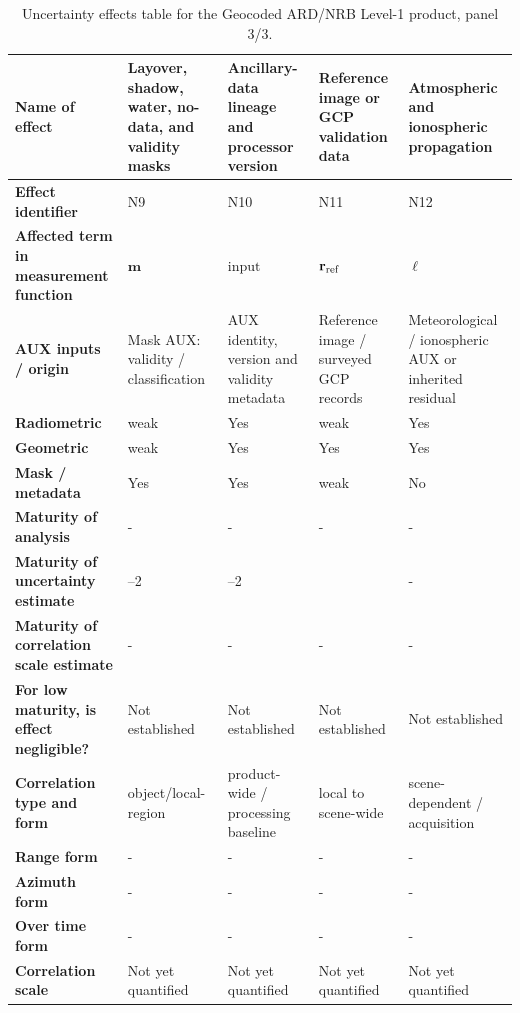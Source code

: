 \begin{table}[p]
\centering\scriptsize
\renewcommand{\arraystretch}{1.1}
\caption{Uncertainty effects table for the Geocoded ARD/NRB Level-1 product, panel 3/3.}
\label{tab:nrb_effects_table_proposed_3}
\begin{tabularx}{\textwidth}{|>{\raggedright\arraybackslash}p{3.0cm}|*{4}{>{\raggedright\arraybackslash}X|}}\hline
\textbf{Name of effect} & Layover, shadow, water, no-data, and validity masks & Ancillary-data lineage and processor version & Reference image or GCP validation data & Atmospheric and ionospheric propagation \\ \hline
\textbf{Effect identifier} & N9 & N10 & N11 & N12 \\ \hline
\textbf{Affected term in measurement function} & $\mathbf m$ & $\text{input lineage}$ & $\mathbf r_{\rm ref}$ & $\boldsymbol\ell$ \\ \hline
\textbf{AUX inputs / origin} & Mask AUX: validity / classification & AUX identity, version and validity metadata & Reference image / surveyed GCP records & Meteorological / ionospheric AUX or inherited residual \\ \hline
\textbf{Radiometric} & weak & Yes & weak & Yes \\ \hline
\textbf{Geometric} & weak & Yes & Yes & Yes \\ \hline
\textbf{Mask / metadata} & Yes & Yes & weak & No \\ \hline
\textbf{Maturity of analysis} & - & - & - & - \\ \hline
\textbf{Maturity of uncertainty estimate} & 1--2 & 1--2 & 2 & - \\ \hline
\textbf{Maturity of correlation scale estimate} & - & - & - & - \\ \hline
\textbf{For low maturity, is effect negligible?} & Not established & Not established & Not established & Not established \\ \hline
\textbf{Correlation type and form} & object/local-region & product-wide / processing baseline & local to scene-wide & scene-dependent / acquisition \\ \hline
\textbf{Range form} & - & - & - & - \\ \hline
\textbf{Azimuth form} & - & - & - & - \\ \hline
\textbf{Over time form} & - & - & - & - \\ \hline
\textbf{Correlation scale} & Not yet quantified & Not yet quantified & Not yet quantified & Not yet quantified \\ \hline

\end{tabularx}
\end{table}
